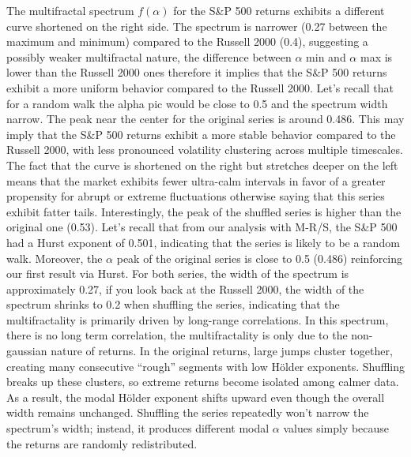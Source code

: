 \documentclass[11pt]{extarticle}
\begin{document}
The multifractal spectrum $f(\alpha)$ for the S\&P 500 returns exhibits a different curve shortened on the right side.
The spectrum is narrower (0.27 between the maximum and minimum) compared to the Russell 2000 (0.4),
suggesting a possibly weaker multifractal nature, the difference between $\alpha$ min and $\alpha$ max is lower than the Russell 2000 ones
therefore it implies that the S\&P 500 returns exhibit a more uniform behavior compared to the Russell 2000. Let's recall that for
a random walk the alpha pic would be close to 0.5 and the spectrum width narrow.
The peak near the center for the original series is around 0.486. This may imply that the S\&P 500 returns exhibit a more stable
behavior compared to the Russell 2000, with less pronounced volatility clustering across multiple timescales.
The fact that the curve is shortened on the right but stretches deeper on the left means that the market exhibits fewer
ultra-calm intervals in favor of a greater propensity for abrupt or extreme fluctuations otherwise saying that this series
exhibit fatter tails.
Interestingly, the peak of the shuffled series is higher than the original one (0.53). Let's recall that from our analysis
with M-R/S, the S\&P 500 had a Hurst exponent of 0.501, indicating that the series is likely to be a random walk.
Moreover, the $\alpha$ peak of the original series is close to 0.5 (0.486)
reinforcing our first result via Hurst.
For both series, the width of the spectrum is approximately 0.27, if you look back at the Russell 2000, the width of the spectrum
shrinks to 0.2 when shuffling the series, indicating that the multifractality is primarily driven by long-range correlations.
In this spectrum, there is no long term correlation, the multifractality is only due to the non-gaussian nature of returns.
In the original returns, large jumps cluster together, creating many consecutive “rough” segments with low Hölder exponents.
Shuffling breaks up these clusters, so extreme returns become isolated among calmer data.
As a result, the modal Hölder exponent shifts upward even though the overall width remains unchanged. Shuffling the
series repeatedly won’t narrow the spectrum’s width; instead, it produces different modal $\alpha$ values simply because
the returns are randomly redistributed. \\
\end{document}
